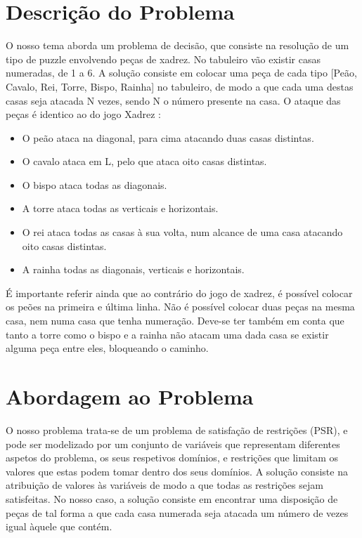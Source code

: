 \documentclass[runningheads]{llncs}
\begin{document}
\section{Descrição do Problema}
O nosso tema aborda um problema de decisão, que consiste na resolução de um tipo de puzzle envolvendo peças de xadrez. 
No tabuleiro vão existir casas numeradas, de 1 a 6.
 A solução consiste em colocar uma peça de cada tipo [Peão, Cavalo, Rei, Torre, Bispo, Rainha] no tabuleiro, de modo a que cada uma destas casas seja
atacada N vezes, sendo N o número presente na casa. O ataque das peças é identico ao do jogo Xadrez \cite{chessmove}:
\begin{itemize}
    \item  O peão ataca na diagonal, para cima atacando duas casas distintas.
    \item  O cavalo ataca em L, pelo que ataca oito casas distintas. 
    \item  O bispo ataca todas as diagonais.
    \item  A torre ataca todas as verticais e horizontais.
    \item  O rei ataca todas as casas à sua volta, num alcance de uma casa atacando oito casas distintas.
    \item  A rainha todas as diagonais, verticais e horizontais.
\end{itemize}

É importante referir ainda que ao contrário do jogo de xadrez, é possível colocar os peões 
na primeira e última linha. Não é possível colocar duas peças na mesma casa, nem numa casa que tenha numeração.
Deve-se ter também em conta que tanto a torre como o bispo e a rainha não atacam uma dada casa se existir alguma peça entre eles, bloqueando o caminho.

\newpage
\section{Abordagem ao Problema}
O nosso problema trata-se de um problema de satisfação de restrições (PSR), e pode ser modelizado por um conjunto de variáveis que representam diferentes aspetos do problema, os seus respetivos domínios, e restrições que limitam os valores que estas podem tomar dentro dos seus domínios.
A solução consiste na atribuição de valores às variáveis de modo a que todas as restrições sejam satisfeitas. No nosso caso, a solução consiste em encontrar uma disposição de peças de tal forma a que cada casa numerada seja atacada um número de vezes igual àquele que contém.
\end{document}
